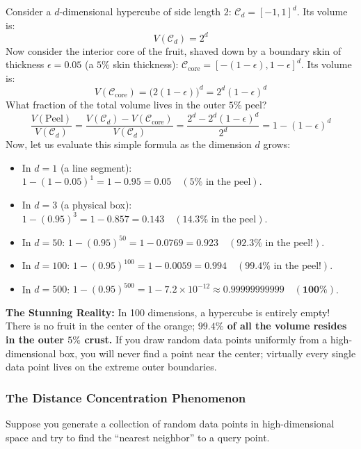 Consider a $d$-dimensional hypercube of side length $2$: $\mathcal{C}_d = [-1, 1]^d$. Its volume is:
\begin{equation}
V(\mathcal{C}_d) = 2^d
\end{equation}
Now consider the interior core of the fruit, shaved down by a boundary skin of thickness $\epsilon = 0.05$ (a $5\%$ skin thickness): $\mathcal{C}_{\text{core}} = [-(1 - \epsilon), 1 - \epsilon]^d$. Its volume is:
\begin{equation}
V(\mathcal{C}_{\text{core}}) = \big(2(1 - \epsilon)\big)^d = 2^d (1 - \epsilon)^d
\end{equation}
What fraction of the total volume lives in the outer $5\%$ peel?
\begin{equation}
\frac{V(\text{Peel})}{V(\mathcal{C}_d)} = \frac{V(\mathcal{C}_d) - V(\mathcal{C}_{\text{core}})}{V(\mathcal{C}_d)} = \frac{2^d - 2^d(1 - \epsilon)^d}{2^d} = 1 - (1 - \epsilon)^d
\end{equation}
Now, let us evaluate this simple formula as the dimension $d$ grows:
\begin{itemize}
    \item In $d = 1$ (a line segment): $1 - (1 - 0.05)^1 = 1 - 0.95 = \mathbf{0.05} \quad (5\% \text{ in the peel})$.
    \item In $d = 3$ (a physical box): $1 - (0.95)^3 = 1 - 0.857 = \mathbf{0.143} \quad (14.3\% \text{ in the peel})$.
    \item In $d = 50$: $1 - (0.95)^{50} = 1 - 0.0769 = \mathbf{0.923} \quad (\mathbf{92.3\%} \text{ in the peel!})$.
    \item In $d = 100$: $1 - (0.95)^{100} = 1 - 0.0059 = \mathbf{0.994} \quad (\mathbf{99.4\%} \text{ in the peel!})$.
    \item In $d = 500$: $1 - (0.95)^{500} = 1 - 7.2 \times 10^{-12} \approx \mathbf{0.99999999999} \quad (\mathbf{100\%})$.
\end{itemize}
\textbf{The Stunning Reality:} In 100 dimensions, a hypercube is entirely empty! There is no fruit in the center of the orange; \textbf{$99.4\%$ of all the volume resides in the outer $5\%$ crust.} If you draw random data points uniformly from a high-dimensional box, you will never find a point near the center; virtually every single data point lives on the extreme outer boundaries.

\subsubsection{The Distance Concentration Phenomenon}
Suppose you generate a collection of random data points in high-dimensional space and try to find the ``nearest neighbor'' to a query point.

